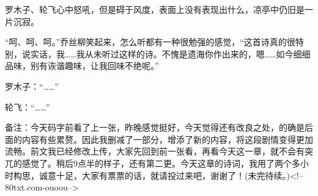 \begin{this_body}
罗木子、轮飞心中怒吼，但是碍于风度，表面上没有表现出什么，凉亭中仍旧是一片沉寂。

“呵、呵、呵。”乔丝柳笑起来，怎么听都有一种很勉强的感觉，“这首诗真的很特别，说实话，我……我从未听过这样的诗。不愧是遗海你作出来的，嗯……如今细细品味，别有诙谐趣味，让我回味不绝呢。”

罗木子：“……”

轮飞：“……”

备注：今天码字前看了上一张，昨晚感觉挺好，今天觉得还有改良之处，的确是后面的内容有些累赘。因此我删减了一部分，增添了新的内容，将这段剧情变得更加流畅。前文我已经修改上传，大家先回到前一张看，再看今天这一章，就不会有突兀的感觉了。稍后9点半的样子，还有第二更。今天这章的诗词，我用了两个多小时构思，诚意十足，大家有票票的话，就请投过来吧，谢谢了！(未完待续。)<!--80txt.com-ouoou-->

\end{this_body}

